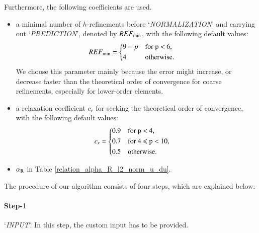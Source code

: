 \documentclass[review,3p]{elsarticle}
\begin{document}
Furthermore, the following coefficients are used.
\begin{itemize}
  \renewcommand\labelitemi{--}
  \item a minimal number of $h$-refinements before `\textit{NORMALIZATION}' and carrying out `\textit{PREDICTION}', denoted by $REF_{\rm min}$, with the following default values:
  \begin{equation}
  \begin{aligned}
      REF_{\rm min} &=
      \begin{cases*}
	9-p & for p $<$ 6, \\
	4 & otherwise.
      \end{cases*}
  \end{aligned}
  \end{equation} 
  We choose this parameter mainly because the error might increase, or decrease faster than the theoretical order of convergence for coarse refinements, especially for lower-order elements.
  \item a relaxation coefficient $c_r$ for seeking the theoretical order of convergence, with the following default values: 
    \begin{equation}
    \begin{aligned}
	c_r &=
	\begin{cases*}
	  0.9 & for p $<$ 4, \\
	  0.7 & for 4 $\leqslant$ p $<$ 10, \\
	  0.5 & otherwise.
	\end{cases*}
    \end{aligned}
    \end{equation}
  \item $\alpha _{\rm R}$ in Table \ref{relation_alpha_R_l2_norm_u_du}.    
\end{itemize}

The procedure of our algorithm consists of four steps, which are explained below:

\paragraph{Step-1} `\textit{INPUT}'. In this step, the custom input has to be provided.
\end{document}
